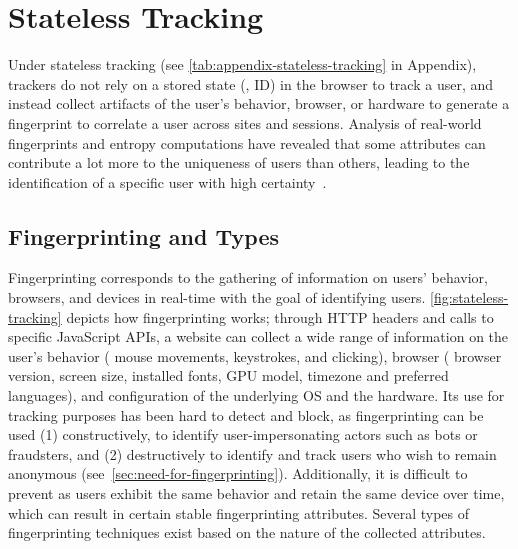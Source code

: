 \section{Stateless Tracking}
\label{sec:stateless-tracking}

Under stateless tracking (see \autoref{tab:appendix-stateless-tracking} in Appendix), trackers do not rely on a stored state (\ie{}, ID) in the browser to track a user, and instead collect artifacts of the user's behavior, browser, or hardware to generate a fingerprint to correlate a user across sites and sessions.
% 
Analysis of real-world fingerprints and entropy computations have revealed that some attributes can contribute a lot more to the uniqueness of users than others, leading to the identification of a specific user with high certainty~\cite{eckersleyHowUniqueYour2010,laperdrixBeautyBeastDiverting2016,gomez-boixHidingCrowdAnalysis2018,bacis2024assessing}. 
%


\subsection{Fingerprinting and Types}

Fingerprinting corresponds to the gathering of information on users’ behavior, browsers, and devices in real-time with the goal of identifying users. 
%
\autoref{fig:stateless-tracking} depicts how fingerprinting works; through HTTP headers and calls to specific JavaScript APIs, a website can collect a wide range of information on the user's behavior (\eg{} mouse movements, keystrokes, and clicking), browser (\eg{} browser version, screen size, installed fonts, GPU model, timezone and preferred languages), and configuration of the underlying OS and the hardware. 
% 
Its use for tracking purposes has been hard to detect and block, as fingerprinting can be used (1) constructively, to identify user-impersonating actors such as bots or fraudsters, and (2) destructively to identify and track users who wish to remain anonymous (see~\autoref{sec:need-for-fingerprinting}). 
%
Additionally, it is difficult to prevent as users exhibit the same behavior and retain the same device over time, which can result in certain stable fingerprinting attributes.
%
Several types of fingerprinting techniques exist based on the nature of the collected attributes.

